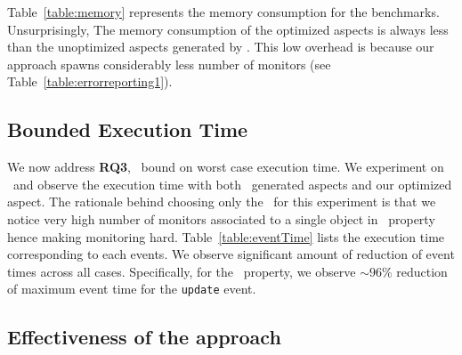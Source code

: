 Table~\ref{table:memory} represents the memory 
consumption for the benchmarks. Unsurprisingly, The memory consumption of the optimized aspects 
is always less than the unoptimized aspects generated by \javamop. This low 
overhead is because our approach spawns considerably less number of 
monitors (see Table~\ref{table:errorreporting1}).

\subsection{Bounded Execution Time}
\label{sec:evaluation:bounded}

We now address \textbf{RQ3}, \ie\ bound on worst case execution time. We
experiment on \bloat\ and observe the execution time with both
\javamop\ generated aspects and our optimized aspect. The rationale behind choosing
only the \bloat\ for this experiment is that we notice very high number of
monitors associated to a single object in \unsafeiter\ property 
hence making monitoring hard.
Table~\ref{table:eventTime} lists  the execution time corresponding to each
events. We observe significant amount of reduction of event times across all
cases.
Specifically, for the \unsafeiter\ property, we observe $\sim$$96\%$ reduction
of maximum event time for the \texttt{update} event.

\subsection{Effectiveness of the approach}
\label{sec:evaluation:effectiveness}


